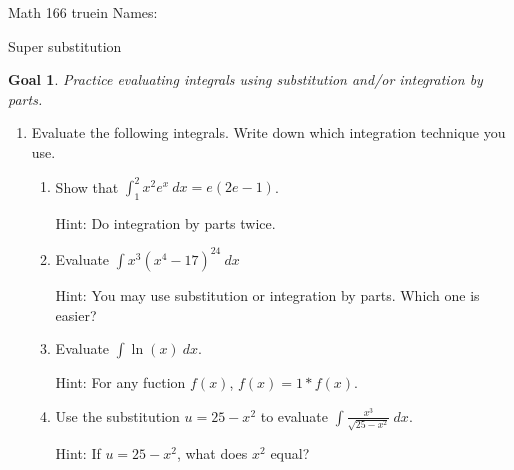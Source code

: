 \documentclass[12pt]{article}
\newtheorem*{goal}{Goal}
\begin{document}
\pagestyle{empty} %

\noindent
{Math 166  truein  Names:\ \hrulefill}

\noindent
{Super substitution}

\medskip

\begin{goal} \rm
Practice evaluating integrals using substitution and/or integration by parts.
\end{goal}

\begin{enumerate}
\item 
Evaluate the following integrals. Write down which integration technique you use.
\begin{enumerate}




\item Show that $\displaystyle\int_1^2 x^2 e^x \ dx = e(2e-1)$.

Hint: Do integration by parts twice.






\vspace{2.25in}

\item  Evaluate $\displaystyle\int x^3(x^4-17)^{24} \ dx$ 

Hint: You may use substitution or integration by parts. Which one is easier?

\pagebreak

\item Evaluate  $\displaystyle\int  \ln(x) \ dx $.

Hint: For any fuction \(f(x)\), \(f(x)=1*f(x)\).



\vspace{3.5in}


\item Use the substitution $u=25-x^2$ to evaluate $\displaystyle\int \frac{x^3}{\sqrt{25-x^2}} \ dx$.

Hint: If $u=25-x^2$, what does $x^2$ equal?


\end{enumerate} 


\end{enumerate} 
\end{document}
